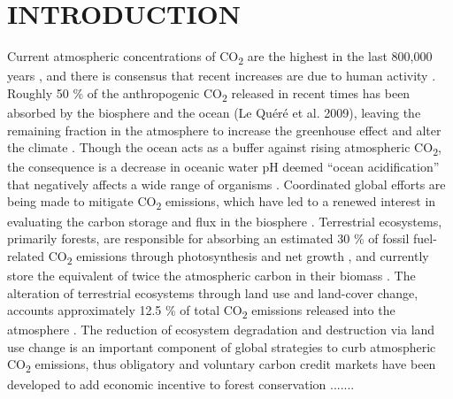 \chapter{INTRODUCTION}		\label{another chapter}

Current atmospheric concentrations of CO\textsubscript{2} are the highest in the last 800,000 years \citep{Luthi:2008wl}, and there is consensus that recent increases are due to human activity \citep{Solomon:2007wl}. Roughly 50 \% of the anthropogenic CO\textsubscript{2} released in recent times has been absorbed by the biosphere and the ocean (Le Quéré et al. 2009), leaving the remaining fraction in the atmosphere to increase the greenhouse effect and alter the climate \citep{Solomon:2007wl}. Though the ocean acts as a buffer against rising atmospheric CO\textsubscript{2}, the consequence is a decrease in oceanic water pH deemed “ocean acidification” \citep{Raven:2005wq, Orr:2005hn} that negatively affects a wide range of organisms \citep{Kroeker:2013if}. Coordinated global efforts are being made to mitigate CO\textsubscript{2} emissions, which have led to a renewed interest in evaluating the carbon storage and flux in the biosphere \citep{Canadell:2008ch, Mcleod:2011gs}. Terrestrial ecosystems, primarily forests, are responsible for absorbing an estimated 30 \% of fossil fuel-related CO\textsubscript{2} emissions through photosynthesis and net growth \citep{Canadell:2007vw}, and currently store the equivalent of twice the atmospheric carbon in their biomass \citep{Canadell:2008ch}. The alteration of terrestrial ecosystems through land use and land-cover change, accounts approximately 12.5 \% of total CO\textsubscript{2} emissions released into the atmosphere \citep{Houghton:2012ch}. The reduction of ecosystem degradation and destruction via land use change is an important component of global strategies to curb atmospheric CO\textsubscript{2} emissions, thus obligatory and voluntary carbon credit markets have been developed to add economic incentive to forest conservation \citep{Rizvi:2015ug}.......


\renewcommand{\thesection}{}
\renewcommand{\thesubsection}{\arabic{section}.\arabic{subsection}}
\makeatletter
\def\@seccntformat#1{\csname #1ignore\expandafter\endcsname\csname the#1\endcsname\quad}
\let\sectionignore\@gobbletwo
\let\latex@numberline\numberline
\def\numberline#1{\if\relax#1\relax\else\latex@numberline{#1}\fi}
\makeatother

\section{}
\begingroup
\setlength{\bibsep}{10pt}
\linespread{1}\selectfont

\renewcommand{\section}[2]{}%


\endgroup
